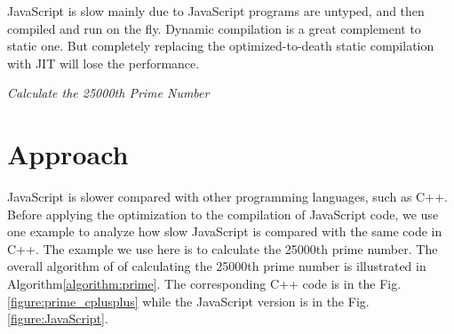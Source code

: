 \documentclass[conference]{IEEEtran}
\begin{document}
%
%

%

JavaScript is slow mainly due to JavaScript programs are untyped, and then compiled and run on the fly. Dynamic compilation is a great complement to static one. But completely replacing the optimized-to-death static compilation with JIT will lose the performance. 
%
%

\begin{algorithm}[hbt!]
\caption{\scriptsize{\emph{Calculate the 25000th Prime Number}}}
 \label{algorithm:prime}
 \begin{algorithmic}[1]
 \begin{scriptsize}
 \REQUIRE {}
        \ENDIF
    \ENDFOR
        \ENDIF
     \ENDIF
\end{scriptsize}
\end{algorithmic}
\end{algorithm}
\section{Approach}
JavaScript is slower compared with other programming languages, such as C++. Before applying the optimization to the compilation of JavaScript code, we use one example to analyze how slow JavaScript is compared with the same code in C++. The example we use here is to calculate the 25000th prime number\cite{google_IO}. The overall algorithm of of calculating the 25000th prime number is illustrated in Algorithm\ref{algorithm:prime}.
The corresponding C++ code is in the Fig.\ref{figure:prime_cplusplus} while the JavaScript version is in the Fig.\ref{figure:JavaScript}.
\end{document}
